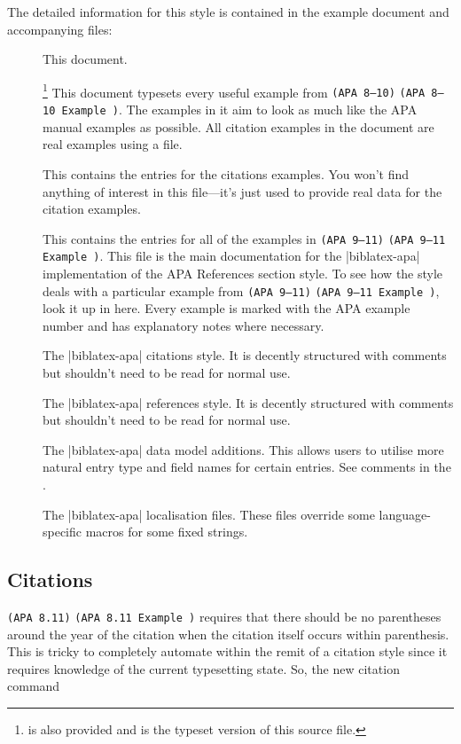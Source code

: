 \documentclass{ltxdockit}
\newcommand\apa[2][]{\ifthenelse{\equal{#1}{}}%
                       {\texttt{(APA #2)}}%
                       {\texttt{(APA #2 Example #1)}}}
\begin{document}
The detailed information for this style is contained in the example document and
accompanying  files:
\begin{description}
\item[] This document.
\item[]\footnote{
    is also provided and is the typeset version of this \latex source
    file.} This document typesets every useful example from
  \apa{8--10}. The examples in it aim to look as much like the APA
  manual examples as possible. All citation examples in the document are
  real examples using a  file.
\item[] This contains the 
  entries for the citations examples. You won't find anything of interest
  in this file---it's just used to provide real data for the citation
  examples.
\item[] This contains the
   entries for all of the examples in \apa{9--11}. This
  file is the main documentation for the |biblatex-apa| implementation of
  the APA References section style. To see how the style deals with a
  particular example from \apa{9--11}, look it up in here. Every
  example is marked with the APA example number and has explanatory notes
  where necessary.
\item[] The |biblatex-apa| citations style. It is
  decently structured with comments but shouldn't need to be read for
  normal use.
\item[] The |biblatex-apa| references style. It is
  decently structured with comments but shouldn't need to be read for
  normal use.
\item[] The |biblatex-apa| data model additions. This allows
  users to utilise more natural entry type and field names for certain
  entries. See comments in the .
\item[] The |biblatex-apa| localisation files. These files
  override some language-specific macros for some fixed strings.
\end{description}

\subsection{Citations}

\apa{8.11} requires that there should be no parentheses around the year of
the citation when the citation itself occurs within parenthesis. This is
tricky to completely automate within the remit of a citation style since it
requires knowledge of the current typesetting state. So, the new citation
command
\end{document}
